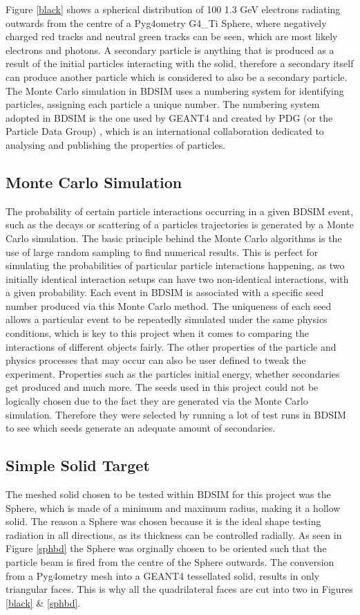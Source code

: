\documentclass[12pt,a4paper]{article}
\begin{document}
\noindent Figure \ref{black} shows a spherical distribution of 100 1.3 GeV electrons radiating outwards from the centre of a Pyg4ometry G4\_Ti Sphere, where negatively charged red tracks and neutral green tracks can be seen, which are most likely electrons and photons. A secondary particle is anything that is produced as a result of the initial particles interacting with the solid, therefore a secondary itself can produce another particle which is considered to also be  a secondary particle. The Monte Carlo simulation in BDSIM uses a numbering system for identifying particles, assigning each particle a unique number. The numbering system adopted in BDSIM is the one used by GEANT4 and created by PDG (or the Particle Data Group) \cite{pdg}, which is an international collaboration dedicated to analysing and publishing the properties of particles. 

\subsection{Monte Carlo Simulation}
\label{monte}
\noindent The probability of certain particle interactions occurring in a given BDSIM event, such as the decays or scattering of a particles trajectories is generated by a Monte Carlo simulation. The basic principle behind the Monte Carlo algorithms is the use of large random sampling to find numerical results. This is perfect for simulating the probabilities of particular particle interactions happening, as two initially identical interaction setups can have two non-identical interactions, with a given probability. Each event in BDSIM is associated with a specific seed number produced via this Monte Carlo method. The uniqueness of each seed allows a particular event to be repeatedly simulated under the same physics conditions, which is key to this project when it comes to comparing the interactions of different objects fairly. The other properties of the particle and physics processes that may occur can also be user defined to tweak the experiment. Properties such as the particles initial energy, whether secondaries get produced and much more. The seeds used in this project could not be logically chosen due to the fact they are generated via the Monte Carlo simulation. Therefore they were selected by running a lot of test runs in BDSIM to see which seeds generate an adequate amount of secondaries.

\subsection{Simple Solid Target}
The meshed solid chosen to be tested within BDSIM for this project was the Sphere, which is made of a minimum and maximum radius, making it a hollow solid. The reason a Sphere was chosen because it is the ideal shape testing radiation in all directions, as its thickness can be controlled radially. As seen in Figure \ref{sphbd} the Sphere was orginally chosen to be oriented such that the particle beam is fired from the centre of the Sphere outwards. The conversion from a Pyg4ometry mesh into a GEANT4 tessellated solid, results in only triangular faces. This is why all the quadrilateral faces are cut into two in Figures \ref{black} \& \ref{sphbd}.
\end{document}
